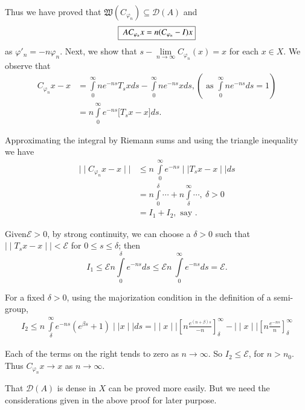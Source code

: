 Thus we have proved that $\mathfrak{W} ( C_{\varphi_{n}} ) \subseteq
\mathscr{D} (A) $ and 
 $$
\begin{fbox}
 { $A C_{\varphi_{n}} x = n ( C_{\varphi_{n}} - I ) x $}
\end{fbox}
$$
as $ \varphi'_n = -n \varphi_n $. Next, we show that $ s-\lim
\limits_{n \rightarrow \infty} C_{\varphi_{n}} (x) = x $ for each $
x \in X $. We observe that 
\begin{align*}
 C_{\varphi_{n}} x - x &= \int\limits^{\infty}_{0} n e^{-ns} T_s x
 ds - \int \limits^{\infty}_{0} n e^{-ns} x ds, ( \text{ as } \int
 \limits^{\infty}_{0} ne^{-ns} ds =1 ) \\ 
 &= n \int \limits^{\infty}_{0} e^{-ns} \big[ T_s x -x \big] ds.
\end{align*}

Approximating the integral by Riemann sums and using the triangle
inequality we have 
\begin{align*}
 \mid\mid C_{\varphi_{n}} x - x \mid\mid &\leq n ~ \int
 \limits^{\infty}_{0} e^{-ns} \mid\mid T_s x-x \mid\mid ds \\ 
 &= n \int \limits^{\delta}_{0} \cdots + n \int
 \limits^{\infty}_{\delta} \cdots, ~ \delta > 0 \\ 
 &= I_1 + I_2 , \text{ say }.
\end{align*}

Given\pageoriginale $ \mathcal{E} > 0 $, by strong continuity, we can choose a $
\delta > 0 $ such that $ \mid\mid T_s x - x \mid\mid < \mathcal{E} $
for $ 0 \leq s \leq \delta $; then 
$$
I_1 \leq \mathcal{E} n \int \limits^{\delta}_{0} e^{-ns} ds \leq
\mathcal{E} n ~ \int \limits^{\infty}_{0} e^{-ns} ds = \mathcal{E}.
$$

For a fixed $ \delta > 0 $, using the majorization condition in the
definition of a semi-group, 
\begin{gather*}
 I_2 \leq n ~ \int \limits^{\infty}_{\delta} e^{-ns} ( e^{\beta s} +
 1 ) \mid\mid x \mid\mid ds 
 = \mid\mid x \mid\mid \left[ n \frac{e^{( n + \beta )s}}{-n}
  \right]^{\infty}_{\delta} - \mid\mid x \mid\mid \left[ n
  \frac{e^{-ns}}{n} \right]^{\infty}_{\delta}
\end{gather*}

Each of the terms on the right tends to zero as $ n \rightarrow
\infty$. So $ I_2 \leq \mathcal{E} $, for $ n > n_0 $. Thus $
C_{\varphi_{n}} x \rightarrow x $ as $ n \rightarrow \infty $. 

\begin{remark*}
 That $ \mathscr{D} (A) $ is dense in $X$ can be proved more
 easily. But we need the considerations given in the above proof for
 later purpose. 
\end{remark*}

